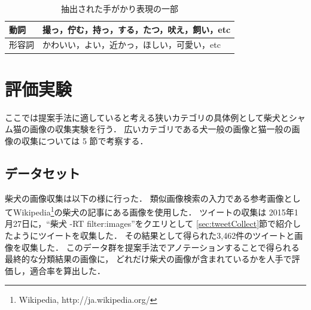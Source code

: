 \documentclass{deimj}
\begin{document}
\begin{table}[bt]
\begin{center}
\caption{抽出された手がかり表現の一部}
\label{tab:predicate}
\begin{tabular}{|l|l|}\hline
動詞& 撮っ，佇む，持っ，する，たつ，吠え，飼い，etc \\ \hline
形容詞& かわいい，よい，近かっ，ほしい，可愛い，etc \\ \hline
\end{tabular}
\end{center}
\end{table}



\section{評価実験}
\label{sec:experiment}

ここでは提案手法に適していると考える狭いカテゴリの具体例として柴犬とシャム猫の画像の収集実験を行う．
広いカテゴリである犬一般の画像と猫一般の画像の収集については
5
節で考察する．

\subsection{データセット}


柴犬の画像収集は以下の様に行った．
類似画像検索の入力である参考画像としてWikipedia\footnote{Wikipedia, http://ja.wikipedia.org/}の柴犬の記事にある画像を使用した．
ツイートの収集は
2015年1月27日に，“柴犬 -RT filter:images”をクエリとして
\ref{sec:tweetCollect}節で紹介したようにツイートを収集した．
その結果として得られた3,462件のツイートと画像を収集した．
このデータ群を提案手法でアノテーションすることで得られる最終的な分類結果の画像に，
どれだけ柴犬の画像が含まれているかを人手で評価し，適合率を算出した．
\end{document}
